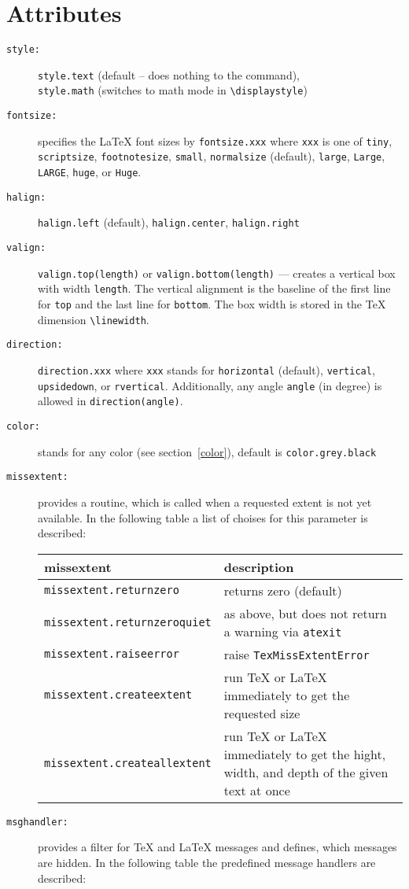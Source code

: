 \section{Attributes}
\begin{description}
\item[\texttt{style:}] \verb|style.text| (default -- does nothing to
the command),\\\verb|style.math| (switches to math mode in
\verb|\displaystyle|)
\item[\texttt{fontsize:}] specifies the \LaTeX{} font sizes by
\verb|fontsize.xxx| where \verb|xxx| is one of
\verb|tiny|,
\verb|scriptsize|,
\verb|footnotesize|,
\verb|small|,
\verb|normalsize| (default),
\verb|large|,
\verb|Large|,
\verb|LARGE|,
\verb|huge|, or
\verb|Huge|.
\item[\texttt{halign:}] \verb|halign.left| (default),
\verb|halign.center|, \verb|halign.right|
\item[\texttt{valign:}] \verb|valign.top(length)| or
\verb|valign.bottom(length)| --- creates a vertical box with width
\verb|length|. The vertical alignment is the baseline of the first line
for \verb|top| and the last line for \verb|bottom|. The box width is
stored in the \TeX{} dimension \verb|\linewidth|.
\item[\texttt{direction:}] \verb|direction.xxx| where \verb|xxx|
stands for \verb|horizontal| (default), \verb|vertical|,
\verb|upsidedown|, or \verb|rvertical|. Additionally, any angle
\verb|angle| (in degree) is allowed in \verb|direction(angle)|.
\item[\texttt{color:}] stands for any \PyX{} color (see
section~\ref{color}), default is \verb|color.grey.black|
\item[\texttt{missextent:}] provides a routine, which is called when a
requested extent is not yet available. In the following table a list
of choises for this parameter is described:

\begin{tabularx}{\linewidth}{l>{\raggedright\arraybackslash}X}
missextent&description\\
\hline
\texttt{missextent.returnzero}&returns zero (default)\\
\texttt{missextent.returnzeroquiet}&as above, but does not return a
warning via \texttt{atexit}\\
\texttt{missextent.raiseerror}&raise \texttt{TexMissExtentError}\\
\texttt{missextent.createextent}&run \TeX{} or \LaTeX{} immediately to
get the requested size\\
\texttt{missextent.createallextent}&run \TeX{} or \LaTeX{} immediately
to get the hight, width, and depth of the given text at once\\
\end{tabularx}
\item[\texttt{msghandler:}] provides a filter for \TeX{} and \LaTeX{}
messages and defines, which messages are hidden. In the following table
the predefined message handlers are described:


\end{description}
